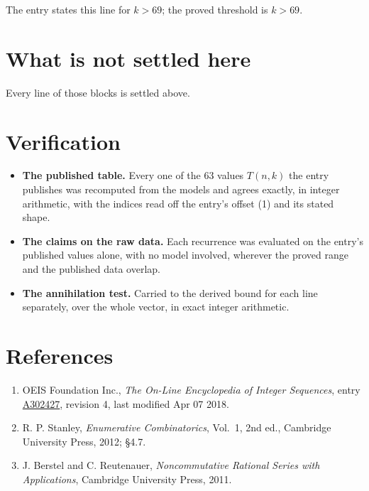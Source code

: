\documentclass[11pt]{article}
\theoremstyle{definition}
\begin{document}
The entry states this line for $k > 69$; the proved threshold is $k > 69$.

\section{What is not settled here}

Every line of those blocks is settled above.

\section{Verification}

\begin{itemize}

\item {\bfseries The published table.} Every one of the 63 values $T(n,k)$ the entry publishes was recomputed from the models and agrees exactly, in integer arithmetic, with the indices read off the entry's offset (1) and its stated shape.

\item {\bfseries The claims on the raw data.} Each recurrence was evaluated on the entry's published values alone, with no model involved, wherever the proved range and the published data overlap.

\item {\bfseries The annihilation test.} Carried to the derived bound for each line separately, over the whole vector, in exact integer arithmetic.

\end{itemize}

\section{References}

\begin{enumerate}

\item OEIS Foundation Inc., \emph{The On-Line Encyclopedia of Integer Sequences}, entry \href{https://oeis.org/A302427}{A302427}, revision 4, last modified Apr 07 2018.

\item R. P. Stanley, \emph{Enumerative Combinatorics}, Vol.~1, 2nd ed., Cambridge University Press, 2012; \S4.7.

\item J. Berstel and C. Reutenauer, \emph{Noncommutative Rational Series with Applications}, Cambridge University Press, 2011.

\end{enumerate}
\end{document}
